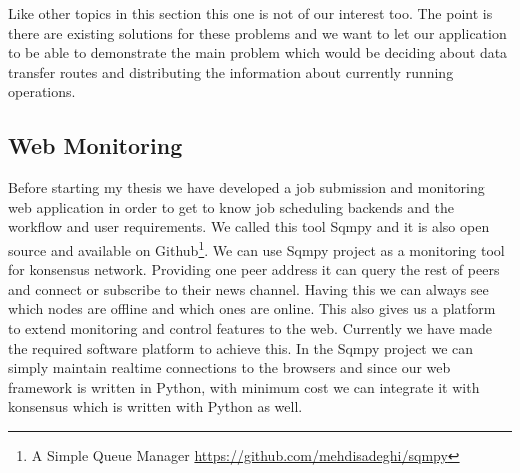 Like other topics in this section this one is not of our interest too.
The point is there are existing solutions for these problems 
and we want to let our application to be able to demonstrate the main problem which would be 
deciding about data transfer routes and distributing the information about currently running operations.

\subsection{Web Monitoring}
Before starting my thesis we have developed a job submission and monitoring web application in order to get to know 
job scheduling backends and the workflow and user requirements. 
We called this tool Sqmpy and it is also open source and available 
on Github\footnote{A Simple Queue Manager \url{https://github.com/mehdisadeghi/sqmpy}}.
We can use Sqmpy project as a monitoring tool for konsensus network.
Providing one peer address it can query the rest of peers and connect or 
subscribe to their news channel. Having this we can always see which nodes are
offline and which ones are online. This also gives us a platform to extend
monitoring and control features to the web. Currently we have made the 
required software platform to achieve this. In the Sqmpy project we can simply maintain realtime connections to the browsers and since
our web framework is written in Python, with minimum cost we can integrate it with konsensus which is written with Python as well.